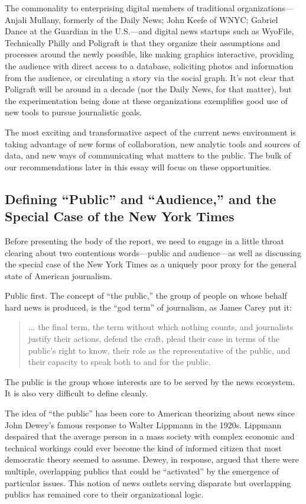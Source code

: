 The commonality to enterprising digital members of traditional organizations—
Anjali Mullany, formerly of the Daily News; John Keefe of WNYC; Gabriel
Dance at the Guardian in the U.S.—and digital news startups such as WyoFile,
Technically Philly and Poligraft is that they organize their assumptions and processes
around the newly possible, like making graphics interactive, providing the
audience with direct access to a database, soliciting photos and information from
the audience, or circulating a story via the social graph. It’s not clear that Poligraft
will be around in a decade (nor the Daily News, for that matter), but the experimentation
being done at these organizations exemplifies good use of new tools
to pursue journalistic goals.

The most exciting and transformative aspect of the current news environment is
taking advantage of new forms of collaboration, new analytic tools and sources
of data, and new ways of communicating what matters to the public. The bulk of
our recommendations later in this essay will focus on these opportunities.

\subsection{Defining ``Public'' and ``Audience,'' and the Special Case of the New York Times}

Before presenting the body of the report, we need to engage in a little throat
clearing about two contentious words—public and audience—as well as discussing
the special case of the New York Times as a uniquely poor proxy for the
general state of American journalism.

Public first. The concept of ``the public,'' the group of people on whose behalf
hard news is produced, is the ``god term'' of journalism, as James Carey put it:
\begin{quote}... the final term, the term without which nothing counts, and journalists
justify their actions, defend the craft, plead their case in terms of the
public’s right to know, their role as the representative of the public, and
their capacity to speak both to and for the public.
\end{quote}

The public is the group whose interests are to be served by the news ecosystem.
It is also very difficult to define cleanly.

The idea of ``the public'' has been core to American theorizing about news since
John Dewey’s famous response to Walter Lippmann in the 1920s. Lippmann
despaired that the average person in a mass society with complex economic
and technical workings could ever become the kind of informed citizen that
most democratic theory seemed to assume. Dewey, in response, argued that there
were multiple, overlapping publics that could be ``activated'' by the emergence
of particular issues. This notion of news outlets serving disparate but overlapping
publics has remained core to their organizational logic.

